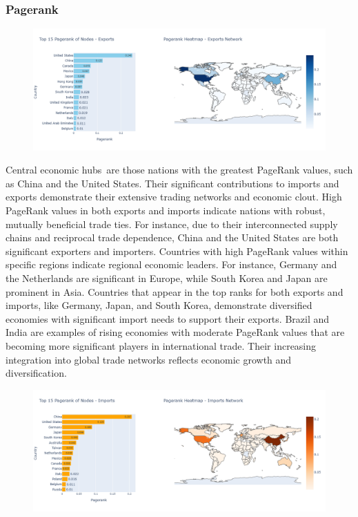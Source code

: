 \documentclass[12pt, a4paper]{article}
\begin{document}
\subsubsection{Pagerank}
\begin{figure}[ht]
\centering
\includegraphics[width=\textwidth]{img/exportpr.png}
\label{fig:exportpr}
\end{figure}
Central economic hubs are those nations with the greatest PageRank values, such as China and the United States. Their significant contributions to imports and exports demonstrate their extensive trading networks and economic clout. High PageRank values in both exports and imports indicate nations with robust, mutually beneficial trade ties. For instance, due to their interconnected supply chains and reciprocal trade dependence, China and the United States are both significant exporters and importers.
Countries with high PageRank values within specific regions indicate regional economic leaders. For instance, Germany and the Netherlands are significant in Europe, while South Korea and Japan are prominent in Asia. Countries that appear in the top ranks for both exports and imports, like Germany, Japan, and South Korea, demonstrate diversified economies with significant import needs to support their exports.
Brazil and India are examples of rising economies with moderate PageRank values that are becoming more significant players in international trade. Their increasing integration into global trade networks reflects economic growth and diversification.


\begin{figure}[ht]
\centering
\includegraphics[width=\textwidth]{img/importpr.png}
\label{fig:importpr}
\end{figure}
\end{document}
